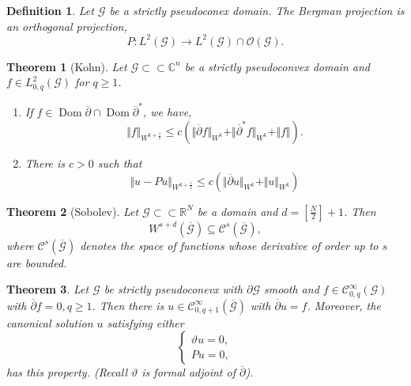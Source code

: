 \documentclass{article}
\newtheorem{theorem}{Theorem} [section]
\newtheorem{definition}{Definition}[section]
\DeclareMathOperator{\Dom}{Dom}
\newcommand{\norm}[1]{\Vert #1 \Vert}
\newcommand{\R}[0]{\mathbb{R}}
\newcommand{\C}[0]{\mathbb{C}}
\newcommand{\G}[0]{\mathcal{G}}
\newcommand{\bd}[0]{\partial}
\newcommand{\cbd}[0]{\overline{\partial}}
\newcommand{\Ouv}[0]{\mathcal{O}}
\newcommand{\compembed}[0]{\subset\subset}
\newcommand{\ck}[1]{\mathcal{C}^{#1}}
\newcommand{\cinf}[0]{\ck{\infty}}
\begin{document}
    \begin{definition}
      Let $\G$ be a strictly pseudoconex domain. The Bergman projection is an orthogonal projection,
      \begin{equation*}
        P:L^2(\G)\to L^2(\G)\cap\Ouv(\G).
      \end{equation*}
    \end{definition}
    \begin{theorem}[Kohn]
      Let $\G\compembed\C^n$ be a strictly pseudoconvex domain and $f\in L_{0,q}^2(\G)$ for $q\geq1$. 
      \begin{enumerate}[1).]
        \item If $f\in\Dom\cbd\cap\Dom\cbd^*$, we have,
        \begin{equation*}
          \norm{f}_{W^{k+{\frac 1 2}}} \leq c(\norm{\cbd f}_{W^k}+\norm{\cbd^* f}_{W^k}+\norm{f}).
        \end{equation*}
        \item There is $c>0$ such that 
        \begin{equation*}
          \norm{u-Pu}_{W^{k+{\frac 1 2}}}\leq c(\norm{\cbd u}_{W^k}+\norm{u}_{W^k})
        \end{equation*}
      \end{enumerate}
    \end{theorem}
    \begin{theorem}[Sobolev]
      Let $\G\compembed\R^N$ be a domain and $d=\left[{\frac N 2}\right]+1$. Then 
      \begin{equation*}
        W^{s+d}(\overline{\G})\subseteq\mathcal{C}^s(\overline{\G}),
      \end{equation*} 
      where $\mathcal{C}^s(\overline{\G})$ denotes the space of functions whose derivative of order up to $s$ are bounded.
    \end{theorem}
    \begin{theorem}
      Let $\G$ be strictly pseudoconevx with $\bd\G$ smooth and $f\in \cinf_{0,q}(\G)$ with $\cbd f=0,q\geq1$. Then there is $u\in\cinf_{0,q+1}(\overline{\G})$ with $\cbd u = f$.
      Moreover, the canonical solution $u$ satisfying either 
      \begin{equation*}
        \begin{cases}
          \vartheta u = 0,\\
          Pu = 0,
        \end{cases}
      \end{equation*}
      has this property. (Recall $\vartheta$ is formal adjoint of $\cbd$).
    \end{theorem}
\end{document}
